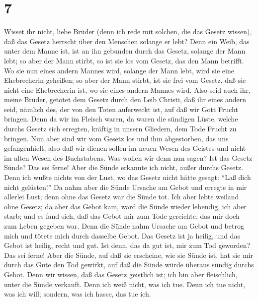 \hypertarget{section-6}{%
\section{7}\label{section-6}}

 Wisset ihr nicht, liebe Brüder (denn ich rede mit solchen,
die das Gesetz wissen), daß das Gesetz herrscht über den Menschen
solange er lebt?  Denn ein Weib, das unter dem Manne ist,
ist an ihn gebunden durch das Gesetz, solange der Mann lebt; so aber der
Mann stirbt, so ist sie los vom Gesetz, das den Mann betrifft.
 Wo sie nun eines andern Mannes wird, solange der Mann lebt,
wird sie eine Ehebrecherin geheißen; so aber der Mann stirbt, ist sie
frei vom Gesetz, daß sie nicht eine Ehebrecherin ist, wo sie eines
andern Mannes wird.  Also seid auch ihr, meine Brüder,
getötet dem Gesetz durch den Leib Christi, daß ihr eines andern seid,
nämlich des, der von den Toten auferweckt ist, auf daß wir Gott Frucht
bringen.  Denn da wir im Fleisch waren, da waren die
sündigen Lüste, welche durchs Gesetz sich erregten, kräftig in unsern
Gliedern, dem Tode Frucht zu bringen.  Nun aber sind wir vom
Gesetz los und ihm abgestorben, das uns gefangenhielt, also daß wir
dienen sollen im neuen Wesen des Geistes und nicht im alten Wesen des
Buchstabens.  Was wollen wir denn nun sagen? Ist das Gesetz
Sünde? Das sei ferne! Aber die Sünde erkannte ich nicht, außer durchs
Gesetz. Denn ich wußte nichts von der Lust, wo das Gesetz nicht hätte
gesagt: ``Laß dich nicht gelüsten!''  Da nahm aber die Sünde
Ursache am Gebot und erregte in mir allerlei Lust; denn ohne das Gesetz
war die Sünde tot.  Ich aber lebte weiland ohne Gesetz; da
aber das Gebot kam, ward die Sünde wieder lebendig,  ich
aber starb; und es fand sich, daß das Gebot mir zum Tode gereichte, das
mir doch zum Leben gegeben war.  Denn die Sünde nahm
Ursache am Gebot und betrog mich und tötete mich durch dasselbe Gebot.
 Das Gesetz ist ja heilig, und das Gebot ist heilig, recht
und gut.  Ist denn, das da gut ist, mir zum Tod geworden?
Das sei ferne! Aber die Sünde, auf daß sie erscheine, wie sie Sünde ist,
hat sie mir durch das Gute den Tod gewirkt, auf daß die Sünde würde
überaus sündig durchs Gebot.  Denn wir wissen, daß das
Gesetz geistlich ist; ich bin aber fleischlich, unter die Sünde
verkauft.  Denn ich weiß nicht, was ich tue. Denn ich tue
nicht, was ich will; sondern, was ich hasse, das tue ich. 
